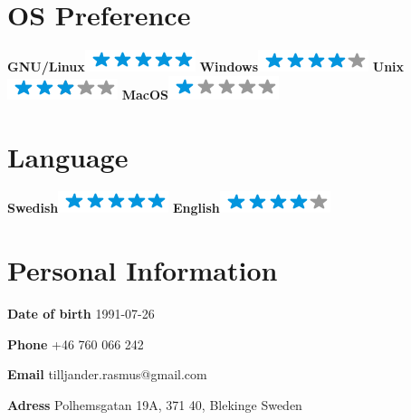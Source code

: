 \documentclass[]{friggeri-cv}
\begin{document}
\begin{aside}
  \section{OS Preference}
    \textbf{GNU/Linux}\includegraphics[scale=0.40]{img/5stars.png}
    \textbf{Windows}\includegraphics[scale=0.40]{img/4stars.png}
    \textbf{Unix}\includegraphics[scale=0.40]{img/3stars.png}
    \textbf{MacOS}\includegraphics[scale=0.40]{img/1stars.png}
    ~
    ~
 \section{Language}
    \textbf{Swedish}\includegraphics[scale=0.40]{img/5stars.png}
    \textbf{English}\includegraphics[scale=0.40]{img/4stars.png}
 ~
 ~
\end{aside}
\vspace{0.5cm}
\section{Personal Information}
\textbf{Date of birth} 1991-07-26

\textbf{Phone} +46 760 066 242

\textbf{Email} tilljander.rasmus@gmail.com

\textbf{Adress} Polhemsgatan 19A, 371 40, Blekinge Sweden

\vspace{0.7cm}
\end{document}
